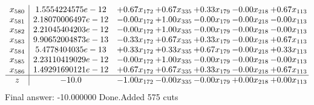 \documentclass[8pt]{article}
\begin{document}
\[\begin{array}{c| c c@{\hskip 2pt} c@{\hskip 2pt} c@{\hskip 2pt} c@{\hskip 2pt} c@{\hskip 2pt} }
 x_{580}   &  1.5554224575e-12 & +  0.67 x_{172} & +  0.67 x_{335} & +  0.33 x_{179} & -0.00 x_{218} & +  0.67 x_{113}\\
 x_{581}   &  2.18070006497e-12 & -0.00 x_{172} & +  1.00 x_{335} & -0.00 x_{179} & -0.00 x_{218} & -0.00 x_{113}\\
 x_{582}   &  2.21045404203e-12 & -0.00 x_{172} & +  1.00 x_{335} & -0.00 x_{179} & -0.00 x_{218} & -0.00 x_{113}\\
 x_{583}   &  9.90652004873e-13 & -0.33 x_{172} & +  0.67 x_{335} & +  0.33 x_{179} & -0.00 x_{218} & +  0.67 x_{113}\\
 x_{584}   &  5.4778404035e-13 & +  0.33 x_{172} & +  0.33 x_{335} & +  0.67 x_{179} & -0.00 x_{218} & +  0.33 x_{113}\\
 x_{585}   &  2.23110419029e-12 & -0.00 x_{172} & +  1.00 x_{335} & -0.00 x_{179} & -0.00 x_{218} & -0.00 x_{113}\\
 x_{586}   &  1.49291690121e-12 & +  0.67 x_{172} & +  0.67 x_{335} & +  0.33 x_{179} & -0.00 x_{218} & +  0.67 x_{113}\\
\hline
z    &  -10.0 & -1.00 x_{172} & -0.00 x_{335} & -0.00 x_{179} & +  0.00 x_{218} & +  0.00 x_{113}\\
\end{array}\]
 Final answer: -10.000000 
Done.Added 575 cuts 
\end{document}
